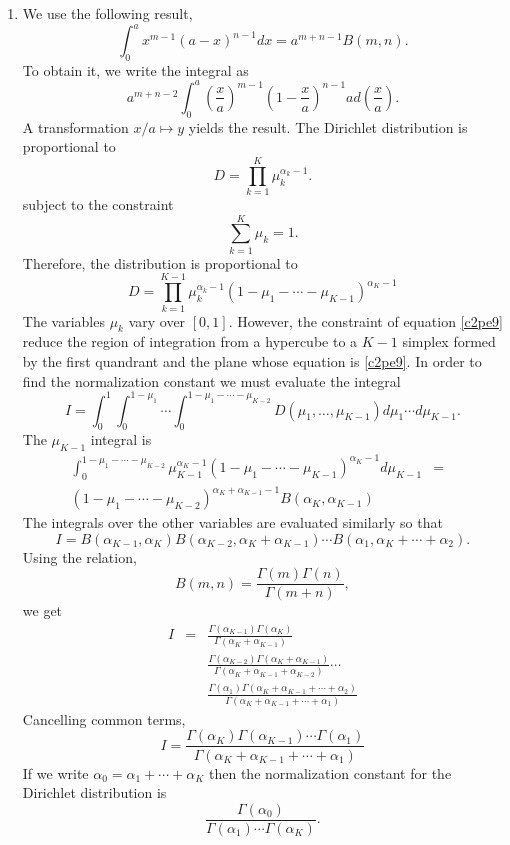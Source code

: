 \begin{enumerate}
\item We use the following result,
\begin{equation}\label{c2pe8}
\int_0^a x^{m-1}(a - x)^{n-1}dx = a^{m+n-1}B(m, n).
\end{equation}
To obtain it, we write the integral as
\[
a^{m+n-2}\int_0^a \left(\frac{x}{a}\right)^{m-1}\left(1 - \frac{x}{a}\right)^{n-1}ad\left(\frac{x}{a}\right).
\]
A transformation $x/a \mapsto y$ yields the result. The Dirichlet distribution is proportional
to 
\[
D = \prod_{k=1}^K\mu_k^{\alpha_k - 1}.
\]
subject to the constraint 
\begin{equation}\label{c2pe9}
\sum_{k=1}^K\mu_k = 1.
\end{equation}
Therefore, the distribution is proportional to
\[
D = \prod_{k=1}^{K-1}\mu_k^{\alpha_k - 1}(1 - \mu_1 - \cdots - \mu_{K-1})^{\alpha_K-1}
\]
The variables $\mu_k$ vary over $[0, 1]$. However, the constraint of equation \eqref{c2pe9} reduce the
region of integration from a hypercube to a $K-1$ simplex formed by the first quandrant and the plane whose 
equation is \eqref{c2pe9}. In order to find the normalization constant we must evaluate the integral
\begin{equation}\label{c2pe10}
I = \int_0^1\int_0^{1-\mu_1}\cdots\int_0^{1-\mu_1-\cdots-\mu_{K-2}}D(\mu_1, \ldots, \mu_{K-1})d\mu_1\cdots d\mu_{K-1}.
\end{equation}
The $\mu_{K-1}$ integral is
\begin{eqnarray*}
\int_0^{1-\mu_1-\cdots-\mu_{K-2}}\mu_{K-1}^{\alpha_K - 1}(1 - \mu_1 - \cdots - \mu_{K-1})^{\alpha_K-1}d\mu_{K-1} &=& \\
 (1-\mu_1-\cdots-\mu_{K-2})^{\alpha_K+\alpha_{K-1}-1}B(\alpha_K, \alpha_{K-1}) & &
\end{eqnarray*}
The integrals over the other variables are evaluated similarly so that
\[
I = B(\alpha_{K-1},\alpha_K)B(\alpha_{K-2},\alpha_{K}+\alpha_{K-1})\cdots B(\alpha_1,\alpha_{K}+\cdots+\alpha_2).
\]
Using the relation,
\[
B(m, n) = \frac{\Gamma(m)\Gamma(n)}{\Gamma(m+n)},
\]
we get
\begin{eqnarray*}
I &=& \frac{\Gamma(\alpha_{K-1})\Gamma(\alpha_K)}{\Gamma(\alpha_{K}+\alpha_{K-1})} \\
  & &  \frac{\Gamma(\alpha_{K-2})\Gamma(\alpha_K+\alpha_{K-1})}{\Gamma(\alpha_K+\alpha_{K-1}+\alpha_{K-2})}\cdots \\
  & &  \frac{\Gamma(\alpha_1)\Gamma(\alpha_K+\alpha_{K-1}+\cdots+\alpha_2)}{\Gamma(\alpha_K+\alpha_{K-1}+\cdots+\alpha_{1})}
\end{eqnarray*}
Cancelling common terms,
\[
I = \frac{\Gamma(\alpha_K)\Gamma(\alpha_{K-1})\cdots\Gamma(\alpha_1)}{\Gamma(\alpha_K+\alpha_{K-1}+\cdots+\alpha_1)}
\]
If we write $\alpha_0 = \alpha_1 + \cdots + \alpha_K$ then the normalization constant for the
Dirichlet distribution is
\[
\frac{\Gamma(\alpha_0)}{\Gamma(\alpha_1)\cdots\Gamma(\alpha_K)}.
\]
\end{enumerate}

